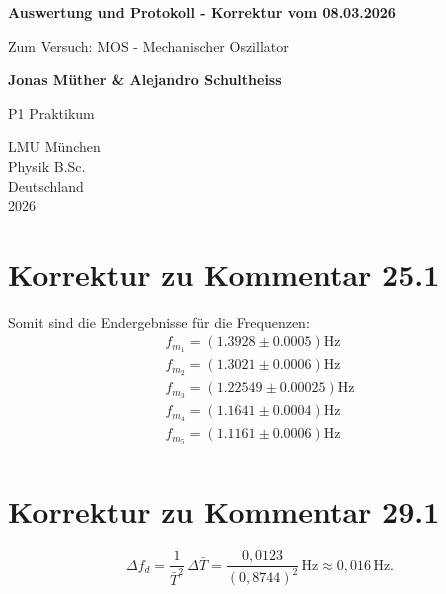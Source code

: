 \documentclass{report}
\begin{document}
\begin{titlepage}
    \begin{center}
        \vspace*{1cm}
            
        \Huge
        \textbf{Auswertung und Protokoll - Korrektur vom 08.03.2026}
            
        \vspace{0.5cm}
        \LARGE
        Zum Versuch: MOS - Mechanischer Oszillator
        
        \vspace{1.8cm}

        \textbf{Jonas Müther \& Alejandro Schultheiss}
        \vfill
            
        P1 Praktikum\\
       
            
        \vspace{0.8cm}
  

        \vspace{1.8cm}
        \Large
        LMU München \\
        Physik B.Sc.\\
        Deutschland\\
        2026
            
    \end{center}
\end{titlepage}
\tableofcontents


\newpage
\section{Korrektur zu Kommentar 25.1}
Somit sind die Endergebnisse für die Frequenzen:
\begin{equation}
    \begin{split}
        f_{m_1} = (1.3928 \pm 0.0005) \si{\hertz} \\
        f_{m_2} = (1.3021 \pm 0.0006) \si{\hertz} \\
        f_{m_3} = (1.22549 \pm 0.00025) \si{\hertz} \\
        f_{m_4} = (1.1641 \pm 0.0004) \si{\hertz} \\
        f_{m_5} = (1.1161 \pm 0.0006) \si{\hertz} \\
    \end{split}
\end{equation}




\section{Korrektur zu Kommentar 29.1}
\[
\Delta f_d
=
\frac{1}{\bar T^2}\,\Delta \bar T
=
\frac{0{,}0123}{(0{,}8744)^2}\,\mathrm{Hz}
\approx 0{,}016\,\mathrm{Hz}.
\]
\end{document}
